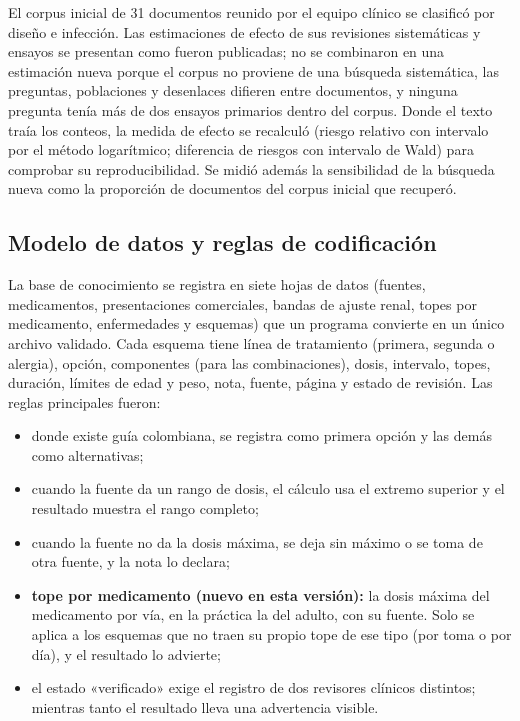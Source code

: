 \documentclass[11pt,a4paper]{article}
\begin{document}
El corpus inicial de 31 documentos reunido por el equipo clínico se clasificó por diseño e infección. Las estimaciones de efecto de sus revisiones sistemáticas y ensayos se presentan como fueron publicadas; no se combinaron en una estimación nueva porque el corpus no proviene de una búsqueda sistemática, las preguntas, poblaciones y desenlaces difieren entre documentos, y ninguna pregunta tenía más de dos ensayos primarios dentro del corpus. Donde el texto traía los conteos, la medida de efecto se recalculó (riesgo relativo con intervalo por el método logarítmico; diferencia de riesgos con intervalo de Wald) para comprobar su reproducibilidad. Se midió además la sensibilidad de la búsqueda nueva como la proporción de documentos del corpus inicial que recuperó.

\subsection{Modelo de datos y reglas de codificación}

La base de conocimiento se registra en siete hojas de datos (fuentes, medicamentos, presentaciones comerciales, bandas de ajuste renal, topes por medicamento, enfermedades y esquemas) que un programa convierte en un único archivo validado. Cada esquema tiene línea de tratamiento (primera, segunda o alergia), opción, componentes (para las combinaciones), dosis, intervalo, topes, duración, límites de edad y peso, nota, fuente, página y estado de revisión. Las reglas principales fueron:

\begin{itemize}
  \item donde existe guía colombiana, se registra como primera opción y las demás como alternativas;
  \item cuando la fuente da un rango de dosis, el cálculo usa el extremo superior y el resultado muestra el rango completo;
  \item cuando la fuente no da la dosis máxima, se deja sin máximo o se toma de otra fuente, y la nota lo declara;
  \item \textbf{tope por medicamento (nuevo en esta versión):} la dosis máxima del medicamento por vía, en la práctica la del adulto, con su fuente. Solo se aplica a los esquemas que no traen su propio tope de ese tipo (por toma o por día), y el resultado lo advierte;
  \item el estado «verificado» exige el registro de dos revisores clínicos distintos; mientras tanto el resultado lleva una advertencia visible.
\end{itemize}
\end{document}
